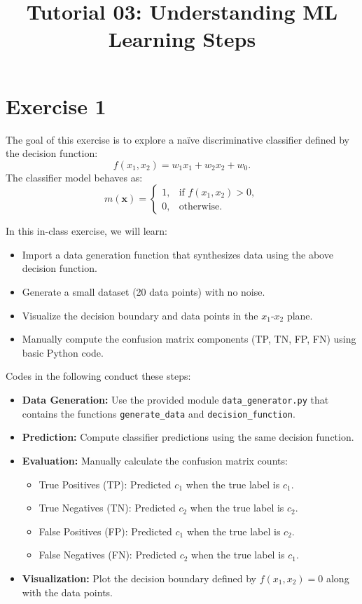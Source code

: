\documentclass[12pt]{article}
\begin{document}
\title{Tutorial 03:  Understanding ML Learning Steps}
\author{}
\date{}


\maketitle

\section*{Exercise 1}

The goal of this exercise is to explore a naïve discriminative classifier defined by the decision function:
\[
f(x_1, x_2) = w_1x_1 + w_2x_2 + w_0.
\]
The classifier model behaves as:
\[
m(\mathbf{x}) =
\begin{cases}
1, & \text{if } f(x_1, x_2) > 0, \\
0, & \text{otherwise.}
\end{cases}
\]

In this in-class exercise, we will learn:
\begin{itemize}
    \item Import a data generation function that synthesizes data using the above decision function.
    \item Generate a small dataset (20 data points) with no noise.
    \item Visualize the decision boundary and data points in the \(x_1\)-\(x_2\) plane.
    \item Manually compute the confusion matrix components (TP, TN, FP, FN) using basic Python code.
\end{itemize}

Codes in the following conduct these steps: 
\begin{itemize}
    \item \textbf{Data Generation:} Use the provided module \texttt{data\_generator.py} that contains the functions \texttt{generate\_data} and \texttt{decision\_function}.
    \item \textbf{Prediction:} Compute classifier predictions using the same decision function.
    \item \textbf{Evaluation:} Manually calculate the confusion matrix counts:
    \begin{itemize}
        \item True Positives (TP): Predicted \(c_1\) when the true label is \(c_1\).
        \item True Negatives (TN): Predicted \(c_2\) when the true label is \(c_2\).
        \item False Positives (FP): Predicted \(c_1\) when the true label is \(c_2\).
        \item False Negatives (FN): Predicted \(c_2\) when the true label is \(c_1\).
    \end{itemize}
    \item \textbf{Visualization:} Plot the decision boundary defined by \(f(x_1,x_2)=0\) along with the data points.
\end{itemize}
\end{document}
